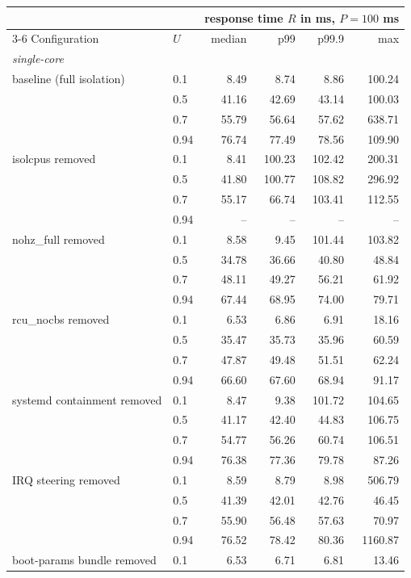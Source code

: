 \begin{tabular}{llrrrr}
\toprule
 &  & \multicolumn{4}{c}{response time $R$ in ms, $P = 100$ ms} \\
\cmidrule(lr){3-6}
Configuration & $U$ & median & p99 & p99.9 & max \\
\midrule
\multicolumn{6}{l}{\textit{single-core}} \\
baseline (full isolation) & 0.1 & 8.49 & 8.74 & 8.86 & 100.24 \\
 & 0.5 & 41.16 & 42.69 & 43.14 & 100.03 \\
 & 0.7 & 55.79 & 56.64 & 57.62 & 638.71 \\
 & 0.94 & 76.74 & 77.49 & 78.56 & 109.90 \\
\addlinespace
isolcpus removed & 0.1 & 8.41 & 100.23 & 102.42 & 200.31 \\
 & 0.5 & 41.80 & 100.77 & 108.82 & 296.92 \\
 & 0.7 & 55.17 & 66.74 & 103.41 & 112.55 \\
 & 0.94 & -- & -- & -- & -- \\
\addlinespace
nohz_full removed & 0.1 & 8.58 & 9.45 & 101.44 & 103.82 \\
 & 0.5 & 34.78 & 36.66 & 40.80 & 48.84 \\
 & 0.7 & 48.11 & 49.27 & 56.21 & 61.92 \\
 & 0.94 & 67.44 & 68.95 & 74.00 & 79.71 \\
\addlinespace
rcu_nocbs removed & 0.1 & 6.53 & 6.86 & 6.91 & 18.16 \\
 & 0.5 & 35.47 & 35.73 & 35.96 & 60.59 \\
 & 0.7 & 47.87 & 49.48 & 51.51 & 62.24 \\
 & 0.94 & 66.60 & 67.60 & 68.94 & 91.17 \\
\addlinespace
systemd containment removed & 0.1 & 8.47 & 9.38 & 101.72 & 104.65 \\
 & 0.5 & 41.17 & 42.40 & 44.83 & 106.75 \\
 & 0.7 & 54.77 & 56.26 & 60.74 & 106.51 \\
 & 0.94 & 76.38 & 77.36 & 79.78 & 87.26 \\
\addlinespace
IRQ steering removed & 0.1 & 8.59 & 8.79 & 8.98 & 506.79 \\
 & 0.5 & 41.39 & 42.01 & 42.76 & 46.45 \\
 & 0.7 & 55.90 & 56.48 & 57.63 & 70.97 \\
 & 0.94 & 76.52 & 78.42 & 80.36 & 1160.87 \\
\addlinespace
boot-params bundle removed & 0.1 & 6.53 & 6.71 & 6.81 & 13.46 \\

\end{tabular}
